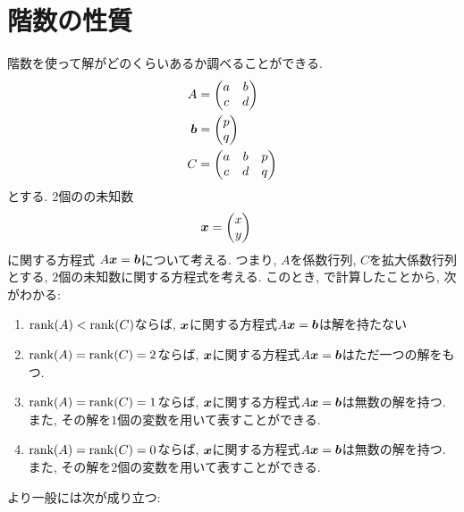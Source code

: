 \section{階数の性質}
階数を使って解がどのくらいあるか調べることができる.
\begin{align*}
  A&=
  \begin{pmatrix}
    a&b\\
    c&d
  \end{pmatrix}\\
  \boldsymbol{b}&=
  \begin{pmatrix}
    p\\
    q
  \end{pmatrix}\\
  C&=
  \begin{pmatrix}
    a&b&p\\
    c&d&q
  \end{pmatrix}
\end{align*}
とする. 2個のの未知数
\begin{align*}
  \boldsymbol{x}&=
  \begin{pmatrix}
    x\\y
  \end{pmatrix}
\end{align*}
に関する方程式 $A\boldsymbol{x}=\boldsymbol{b}$について考える.
つまり, $A$を係数行列, $C$を拡大係数行列とする,
$2$個の未知数に関する方程式を考える.
このとき, で計算したことから,
次がわかる:
\begin{enumerate}
  \item $\operatorname{rank}(A)<\operatorname{rank}(C)$ならば,
  $\boldsymbol{x}$に関する方程式$A\boldsymbol{x}=\boldsymbol{b}$は解を持たない
  \item $\operatorname{rank}(A)=\operatorname{rank}(C)=2$ならば,
  $\boldsymbol{x}$に関する方程式$A\boldsymbol{x}=\boldsymbol{b}$はただ一つの解をもつ.
  \item $\operatorname{rank}(A)=\operatorname{rank}(C)=1$ならば,
    $\boldsymbol{x}$に関する方程式$A\boldsymbol{x}=\boldsymbol{b}$は無数の解を持つ.
    また, その解を$1$個の変数を用いて表すことができる.
  \item $\operatorname{rank}(A)=\operatorname{rank}(C)=0$ならば,
    $\boldsymbol{x}$に関する方程式$A\boldsymbol{x}=\boldsymbol{b}$は無数の解を持つ.
    また, その解を$2$個の変数を用いて表すことができる.
\end{enumerate}
より一般には次が成り立つ:
